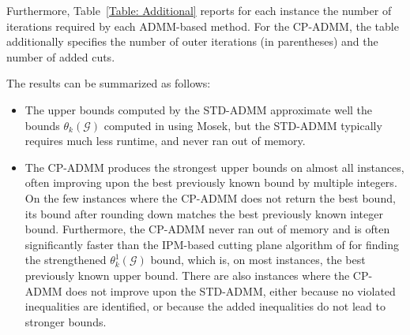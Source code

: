 \documentclass[11pt, a4paper]{article}
\newcommand{\mc}{\mathcal}
\begin{document}
Furthermore, Table~\ref{Table: Additional} reports for each instance the number of iterations required by each ADMM-based method. For the CP-ADMM, the table additionally specifies the number of outer iterations (in parentheses) and the number of added cuts.

The results can be summarized as follows:
\begin{itemize}
    \item The upper bounds computed by the STD-ADMM approximate well the bounds $\theta_k(\mc{G})$ computed in \cite{Kuryatnikova2022MkCSProblem} using Mosek, but the STD-ADMM typically requires much less runtime, and never ran out of memory.
    \item The CP-ADMM produces the strongest upper bounds on almost all instances, often improving upon the best previously known bound by multiple integers. 
    On the few instances where the CP-ADMM does not return the best bound, its bound after rounding down matches the best previously known integer bound.
    Furthermore, the CP-ADMM never ran out of memory and is often significantly faster than the IPM-based cutting plane algorithm of \cite{Kuryatnikova2022MkCSProblem} for finding the strengthened $\theta^1_k(\mc{G})$ bound, which is, on most instances, the best previously known upper bound. 
    There are also instances where the CP-ADMM does not improve upon the STD-ADMM, either because no violated inequalities are identified, or because the added inequalities do not lead to stronger bounds.
\end{itemize}
\end{document}
